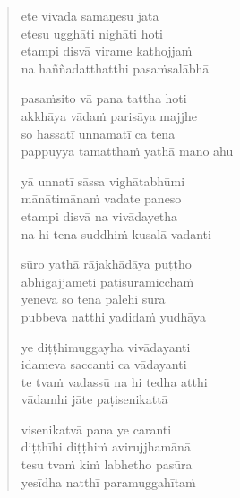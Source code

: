 \clearpage
\begin{verse}

ete vivādā samaṇesu jātā\\
etesu ugghāti nighāti hoti\\
etampi disvā virame kathojjaṁ\\
na haññadatthatthi pasaṁsalābhā

pasaṁsito vā pana tattha hoti\\
akkhāya vādaṁ parisāya majjhe\\
so hassatī unnamatī ca tena\\
pappuyya tamatthaṁ yathā mano ahu

yā unnatī sāssa vighātabhūmi\\
mānātimānaṁ vadate paneso\\
etampi disvā na vivādayetha\\
na hi tena suddhiṁ kusalā vadanti

sūro yathā rājakhādāya puṭṭho\\
abhigajjameti paṭisūramicchaṁ\\
yeneva so tena palehi sūra\\
pubbeva natthi yadidaṁ yudhāya

ye diṭṭhimuggayha vivādayanti\\
idameva saccanti ca vādayanti\\
te tvaṁ vadassū na hi tedha atthi\\
vādamhi jāte paṭisenikattā

visenikatvā pana ye caranti\\
diṭṭhīhi diṭṭhiṁ avirujjhamānā\\
tesu tvaṁ kiṁ labhetho pasūra\\
yesīdha natthī paramuggahītaṁ

\end{verse}


